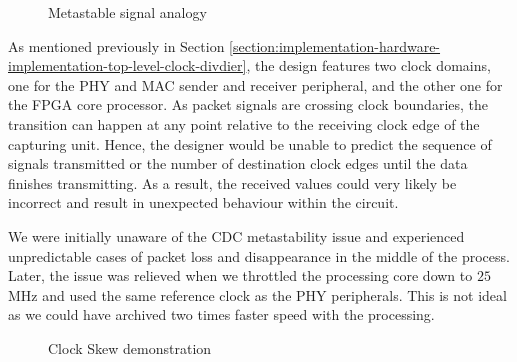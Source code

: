 \documentclass[a4paper]{report}
\begin{document}
\begin{figure}[h!]
  \caption{Metastable signal analogy \cite{stephenson-2009}}
  \label{fig:metastability-analogy}
\end{figure}

As mentioned previously in Section \ref{section:implementation-hardware-implementation-top-level-clock-divdier}, the design features two clock domains, one for the PHY and MAC sender and receiver peripheral, and the other one for the FPGA core processor. As packet signals are crossing clock boundaries, the transition can happen at any point relative to the receiving clock edge of the capturing unit. Hence, the designer would be unable to predict the sequence of signals transmitted or the number of destination clock edges until the data finishes transmitting. As a result, the received values could very likely be incorrect and result in unexpected behaviour within the circuit. 
 
We were initially unaware of the CDC metastability issue and experienced unpredictable cases of packet loss and disappearance in the middle of the process. Later, the issue was relieved when we throttled the processing core down to $25$ MHz and used the same reference clock as the PHY peripherals. This is not ideal as we could have archived two times faster speed with the processing.

\begin{figure}[h!]
  \caption{Clock Skew demonstration \cite{arar-2018}}
  \label{fig:clock-skew}
\end{figure}
\end{document}
